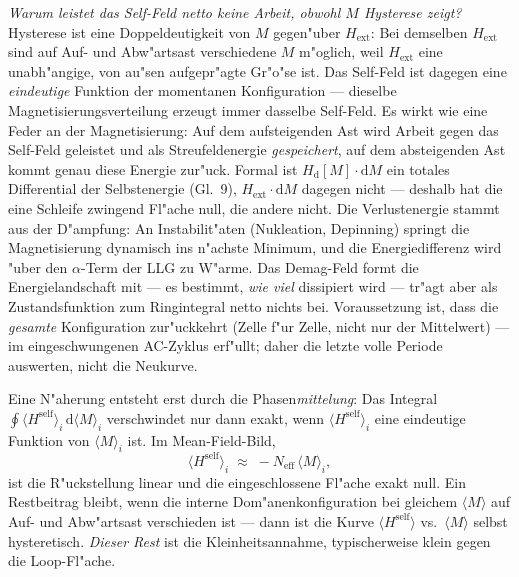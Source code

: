 \documentclass[11pt,a4paper]{article}
\begin{document}
\emph{Warum leistet das Self-Feld netto keine Arbeit, obwohl $M$ Hysterese zeigt?} Hysterese ist eine Doppeldeutigkeit von $M$ gegen"uber $H_\text{ext}$: Bei demselben $H_\text{ext}$ sind auf Auf- und Abw"artsast verschiedene $M$ m"oglich, weil $H_\text{ext}$ eine unabh"angige, von au"sen aufgepr"agte Gr"o"se ist. Das Self-Feld ist dagegen eine \emph{eindeutige} Funktion der momentanen Konfiguration --- dieselbe Magnetisierungsverteilung erzeugt immer dasselbe Self-Feld. Es wirkt wie eine Feder an der Magnetisierung: Auf dem aufsteigenden Ast wird Arbeit gegen das Self-Feld geleistet und als Streufeldenergie \emph{gespeichert}, auf dem absteigenden Ast kommt genau diese Energie zur"uck. Formal ist $H_\mathrm{d}[M]\cdot\mathrm{d}M$ ein totales Differential der Selbstenergie (Gl.~9), $H_\text{ext}\cdot\mathrm{d}M$ dagegen nicht --- deshalb hat die eine Schleife zwingend Fl"ache null, die andere nicht. Die Verlustenergie stammt aus der D"ampfung: An Instabilit"aten (Nukleation, Depinning) springt die Magnetisierung dynamisch ins n"achste Minimum, und die Energiedifferenz wird "uber den $\alpha$-Term der LLG zu W"arme. Das Demag-Feld formt die Energielandschaft mit --- es bestimmt, \emph{wie viel} dissipiert wird --- tr"agt aber als Zustandsfunktion zum Ringintegral netto nichts bei. Voraussetzung ist, dass die \emph{gesamte} Konfiguration zur"uckkehrt (Zelle f"ur Zelle, nicht nur der Mittelwert) --- im eingeschwungenen AC-Zyklus erf"ullt; daher die letzte volle Periode auswerten, nicht die Neukurve.

Eine N"aherung entsteht erst durch die Phasen\emph{mittelung}: Das Integral
$\oint \langle H^\text{self} \rangle_i \, \mathrm{d}\langle M \rangle_i$
verschwindet nur dann exakt, wenn $\langle H^\text{self} \rangle_i$ eine eindeutige Funktion von $\langle M \rangle_i$ ist. Im Mean-Field-Bild,
\begin{equation}
\langle H^\text{self} \rangle_i \;\approx\; -N_\text{eff} \, \langle M \rangle_i ,
\end{equation}
ist die R"uckstellung linear und die eingeschlossene Fl"ache exakt null. Ein Restbeitrag bleibt, wenn die interne Dom"anenkonfiguration bei gleichem $\langle M \rangle$ auf Auf- und Abw"artsast verschieden ist --- dann ist die Kurve $\langle H^\text{self} \rangle$ vs.\ $\langle M \rangle$ selbst hysteretisch. \emph{Dieser Rest} ist die Kleinheitsannahme, typischerweise klein gegen die Loop-Fl"ache.
\end{document}
